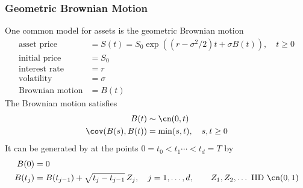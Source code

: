 \documentclass[10pt,compress,xcolor={usenames,dvipsnames}]{beamer} %
\begin{document}
\begin{frame}
\frametitle{Geometric Brownian Motion}
One common model for assets is the geometric Brownian motion
\begin{align*}
\text{asset price} &= S(t) = S_0 \exp((r-\sigma^2/2)t + \sigma B(t)), \quad t \ge 0 \\
\text{initial price} & = S_0 \\
\text{interest rate} & = r \\
\text{volatility} & = \sigma\\
\text{Brownian motion} & = B(t)
\end{align*}
The Brownian motion satisfies
\begin{align*}
B(t) &\sim \cn(0,t) \\
\cov(B(s),B(t)) &= \min(s,t), \quad s,t \ge 0
\end{align*}
It can be generated by at the points $0=t_0 < t_1 \cdots < t_d = T$ by 
\begin{align*}
B(0) &= 0\\
B(t_j) &= B(t_{j-1}) + \sqrt{t_j -t_{j-1}} \, Z_j, \quad j=1, \ldots, d, \qquad Z_1, Z_2, \ldots \text{ IID } \cn(0,1)
\end{align*}

\end{frame}
\end{document}

